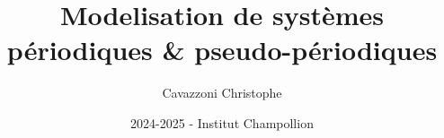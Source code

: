 \documentclass{report}
\title{Modelisation de systèmes périodiques \& pseudo-périodiques}
\author{Cavazzoni Christophe}
\date{2024-2025 - Institut Champollion}
\begin{document}
   \maketitle
   \tableofcontents

   
   \pagebreak   

   
   \pagebreak 
   
   
   \pagebreak   

   
   \pagebreak   
\end{document}
